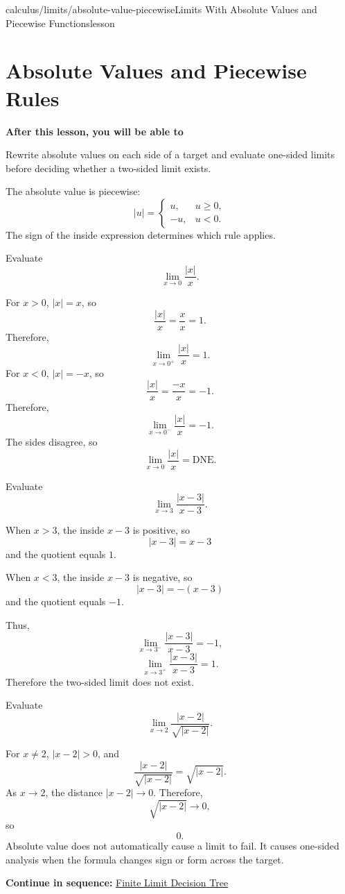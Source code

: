 \documentclass[11pt,openany]{book}
\theoremstyle{bgplain}
\newcounter{bgexample}[chapter]
\newcommand{\webnext}[2]{%
  \par\addvspace{1.2em}\noindent{\color{BGLine}\rule{\textwidth}{0.35pt}}\par\smallskip
  {\small\color{BGGray}\textbf{Continue in sequence:} \hyperlink{web:#1}{#2}}\par
}
\newcommand{\lessonobjective}[1]{%
  \par\Needspace{4\baselineskip}\addvspace{0.6em}%
  {\bfseries\color{BGInk}After this lesson, you will be able to}\par\smallskip
  #1\par\addvspace{0.5em}%
}
\newcommand{\DNE}{\mathrm{DNE}}
\begin{document}
\begin{webpage}{calculus/limits/absolute-value-piecewise}{Limits With Absolute Values and Piecewise Functions}{lesson}
\section{Absolute Values and Piecewise Rules}

\lessonobjective{
Rewrite absolute values on each side of a target and evaluate one-sided limits before deciding whether a two-sided limit exists.
}

The absolute value is piecewise:
\[
  |u|=
  \begin{cases}
    u,&u\ge0,\\
    -u,&u<0.
  \end{cases}
\]
The sign of the inside expression determines which rule applies.

\begin{bgguided}[title={\(|x|/x\)}]
Evaluate
\[
  \lim_{x\to0}\frac{|x|}{x}.
\]

\begin{bgsolution}
For \(x>0\), \(|x|=x\), so
\[
  \frac{|x|}{x}=\frac{x}{x}=1.
\]
Therefore,
\[
  \lim_{x\to0^+}\frac{|x|}{x}=1.
\]
For \(x<0\), \(|x|=-x\), so
\[
  \frac{|x|}{x}=\frac{-x}{x}=-1.
\]
Therefore,
\[
  \lim_{x\to0^-}\frac{|x|}{x}=-1.
\]
The sides disagree, so
\[
  \boxed{\lim_{x\to0}\frac{|x|}{x}=\DNE}.
\]
\end{bgsolution}
\end{bgguided}

\begin{bgexample}[title={A shifted absolute value}]
Evaluate
\[
  \lim_{x\to3}\frac{|x-3|}{x-3}.
\]

\begin{bgsolution}
When \(x>3\), the inside \(x-3\) is positive, so
\[
  |x-3|=x-3
\]
and the quotient equals \(1\).

When \(x<3\), the inside \(x-3\) is negative, so
\[
  |x-3|=-(x-3)
\]
and the quotient equals \(-1\).

Thus,
\[
  \lim_{x\to3^-}\frac{|x-3|}{x-3}=-1,
\]
\[
  \lim_{x\to3^+}\frac{|x-3|}{x-3}=1.
\]
Therefore the two-sided limit does not exist.
\end{bgsolution}
\end{bgexample}

\begin{bgexample}[title={An absolute value whose limit does exist}]
Evaluate
\[
  \lim_{x\to2}\frac{|x-2|}{\sqrt{|x-2|}}.
\]

\begin{bgsolution}
For \(x\ne2\), \(|x-2|>0\), and
\[
  \frac{|x-2|}{\sqrt{|x-2|}}=\sqrt{|x-2|}.
\]
As \(x\to2\), the distance \(|x-2|\to0\). Therefore,
\[
  \sqrt{|x-2|}\to0,
\]
so
\[
  \boxed{0}.
\]
Absolute value does not automatically cause a limit to fail. It causes one-sided analysis when the formula changes sign or form across the target.
\end{bgsolution}
\end{bgexample}
\webnext{calculus/limits/finite-limit-decision-tree}{Finite Limit Decision Tree}
\end{webpage}
\end{document}
